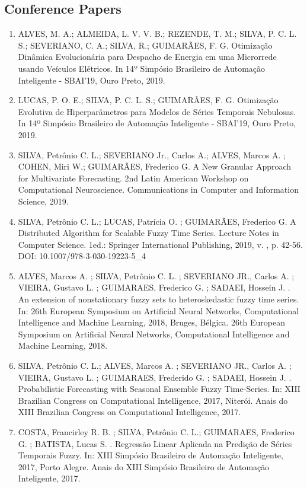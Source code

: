 \subsection{Conference Papers}
\begin{enumerate}
\item  ALVES, M. A.; ALMEIDA, L. V. V. B.; REZENDE, T. M.; SILVA, P. C. L. S.; SEVERIANO, C. A.; SILVA, R.; GUIMARÃES, F. G. Otimização Dinâmica Evolucionária para Despacho de Energia em uma Microrrede usando Veículos Elétricos. In 14º Simpósio Brasileiro de Automação Inteligente - SBAI'19, Ouro Preto, 2019.
\item  LUCAS, P. O. E.; SILVA, P. C. L. S.; GUIMARÃES, F. G. Otimização Evolutiva de Hiperparâmetros para Modelos de Séries Temporais Nebulosas.  In 14º Simpósio Brasileiro de Automação Inteligente - SBAI'19, Ouro Preto, 2019.
\item SILVA, Petrônio C. L.; SEVERIANO Jr., Carlos A.; ALVES, Marcos A. ; COHEN, Miri W.; GUIMARÃES, Frederico G. A New Granular Approach for Multivariate Forecasting. 2nd Latin American Workshop on Computational Neuroscience. Communications in Computer and Information Science, 2019.
\item SILVA, Petrônio C. L.; LUCAS, Patrícia O. ; GUIMARÃES, Frederico G. A Distributed Algorithm for Scalable Fuzzy Time Series. Lecture Notes in Computer Science. 1ed.: Springer International Publishing, 2019, v. , p. 42-56. DOI: 10.1007/978-3-030-19223-5\_4 \nocite{Silva2019}
\item ALVES, Marcos A. ; SILVA, Petrônio C. L. ; SEVERIANO JR., Carlos A. ; VIEIRA, Gustavo L. ; GUIMARAES, Frederico G. ; SADAEI, Hossein J. . An extension of nonstationary fuzzy sets to heteroskedastic fuzzy time series. In: 26th European Symposium on Artificial Neural Networks, Computational Intelligence and Machine Learning, 2018, Bruges, Bélgica. 26th European Symposium on Artificial Neural Networks, Computational Intelligence and Machine Learning, 2018.\nocite{Alves2018}
\item SILVA, Petrônio C. L.; ALVES, Marcos A. ; SEVERIANO JR., Carlos A. ; VIEIRA, Gustavo L. ; GUIMARAES, Frederido G. ; SADAEI, Hossein J. . Probabilistic Forecasting with Seasonal Ensemble Fuzzy Time-Series. In: XIII Brazilian Congress on Computational Intelligence, 2017, Niterói. Anais do XIII Brazilian Congress on Computational Intelligence, 2017.\nocite{Silva2017ensemble}
\item COSTA, Francirley R. B. ; SILVA, Petrônio C. L.; GUIMARAES, Frederico G. ; BATISTA, Lucas S. . Regressão Linear Aplicada na Predição de Séries Temporais Fuzzy. In: XIII Simpósio Brasileiro de Automação Inteligente, 2017, Porto Alegre. Anais do XIII Simpósio Brasileiro de Automação Inteligente, 2017. \nocite{Costa2017}

\end{enumerate}
